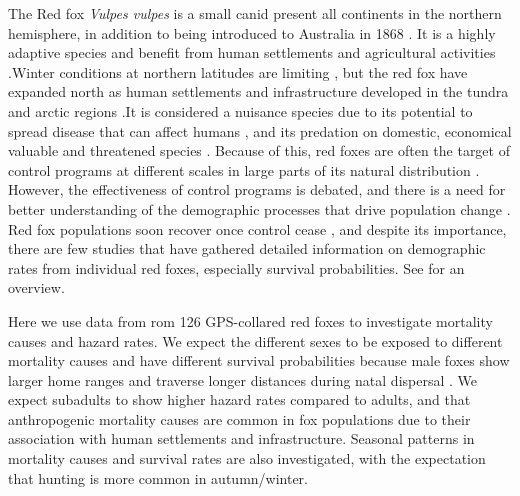 \documentclass[12pt,a4paper,final,abstract=true,headings=small]{scrartcl}
\begin{document}
The Red fox \emph{Vulpes vulpes} is a small canid present all continents in the northern hemisphere, in addition to being introduced to Australia in 1868 \citep{lariviereVulpesVulpes1996}. It is a highly adaptive species and benefit from human settlements and agricultural activities \citep{panekRedFoxVulpesVulpes2002,jahrenImpactHumanLand2020,diaz-ruizDriversRedFox2016}.Winter conditions at northern latitudes are limiting \citep{bartonWinterSeverityLimits2007}, but the red fox have expanded north as human settlements and infrastructure developed in the tundra and arctic regions \citep{gallantDisentanglingRelativeInfluences2020}.It is considered a nuisance species due to its potential to spread disease that can affect humans \citep{andersonPopulationDynamicsFox1981,maasSignificantIncreaseEchinococcus2014}, and its predation on domestic, economical valuable and threatened species \citep{mcleodPotentialParticipatoryLandscape2010,jarnemoREDFOXREMOVAL2005,kammerlePredationPredatorControl2019}. Because of this, red foxes are often the target of control programs at different scales in large parts of its natural distribution \citep{rushtonEffectsCullingFox2006,kammerlePredationPredatorControl2019,loonstraEffectDifferentMammalian2024,heydonDemographyRuralFoxes2000}. However, the effectiveness of control programs is debated, and there is a need for better understanding of the demographic processes that drive population change \citep{newsomeRapidRecolonisationEuropean2014,kammerlePredationPredatorControl2019}. Red fox populations soon recover once control cease \citep{newsomeRapidRecolonisationEuropean2014}, and despite its importance, there are few studies that have gathered detailed information on demographic rates from individual red foxes, especially survival probabilities. See \citet{devenish-nelsonDemographyCarnivoreRed2013} for an overview.

Here we use data from rom 126 GPS-collared red foxes to investigate mortality causes and hazard rates. We expect the different sexes to be exposed to different mortality causes and have different survival probabilities because male foxes show larger home ranges \citep{waltonVariationHomeRange2017} and traverse longer distances during natal dispersal \citep{englundPopulationDynamicsRed1980}. We expect subadults to show higher hazard rates compared to adults, and that anthropogenic  mortality causes are common in fox populations due to their association with human settlements and infrastructure. Seasonal patterns in mortality causes and survival rates are also investigated, with the expectation that hunting is more common in autumn/winter.
\end{document}
